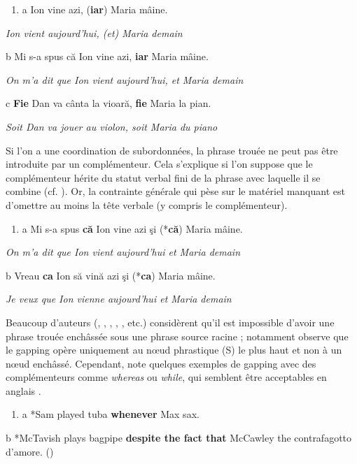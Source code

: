 \begin{enumerate}
\item \label{bkm:Ref289076905}a  Ion vine azi, (\textbf{iar}) Maria mâine.


\end{enumerate}
{\itshape
Ion vient aujourd'hui, (et) Maria demain  } 

  b  Mi s-a spus că Ion vine azi, \textbf{iar} Maria mâine.

{\itshape
On m'a dit que Ion vient aujourd'hui, et Maria demain} 

  c  \textbf{Fie} Dan va cânta la vioară, \textbf{fie} Maria la pian.

{\itshape
Soit Dan va jouer au violon, soit Maria du piano      } 

Si l'on a une coordination de subordonnées, la phrase trouée ne peut pas être introduite par un complémenteur. Cela s'explique si l'on suppose que le complémenteur hérite du statut verbal fini de la phrase avec laquelle il se combine (cf. \citet{Godard1989}). Or, la contrainte générale qui pèse sur le matériel manquant est d'omettre au moins la tête verbale (y compris le complémenteur). 


\begin{enumerate}
\item \label{bkm:Ref289277143}a  Mi s-a spus \textbf{că} Ion vine azi şi (*\textbf{că}) Maria mâine.


\end{enumerate}
{\itshape
On m'a dit que Ion vient aujourd'hui et Maria demain  } 

  b  Vreau \textbf{ca} Ion să vină azi şi (*\textbf{ca}) Maria mâine.

{\itshape
Je veux que Ion vienne aujourd'hui et Maria demain} 

Beaucoup d'auteurs (\citet{Jackendoff1971}, \citet{Koutsoudas1971}, \citet{Hankamer1979}, \citet{Wilder1994}, \citet{Johnson2009}, etc.) considèrent qu'il est impossible d'avoir une phrase trouée enchâssée sous une phrase source racine  ; \citet{Sag1976} notamment observe que le gapping opère uniquement au n{\oe}ud phrastique (S) le plus haut et non à un n{\oe}ud enchâssé. Cependant, \citet{Izutsu2008} note quelques exemples de gapping avec des complémenteurs comme \textit{whereas} ou\textit{ while}, qui semblent être acceptables en anglais . 


\begin{enumerate}
\item \label{bkm:Ref289077384}\label{bkm:Ref299639546}a   *Sam played tuba \textbf{whenever} Max sax.          


\end{enumerate}
b  *McTavish plays bagpipe \textbf{despite the fact that} McCawley the contrafagotto d'amore.                  (\citet{Jackendoff1971})


